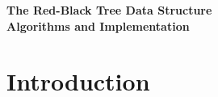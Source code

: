 \documentclass[10pt]{article}
\begin{document}
\begin{center}
  \textbf{The Red-Black Tree Data Structure} \\
  \textbf{Algorithms and Implementation}
\end{center}

\section{Introduction}
\end{document}
